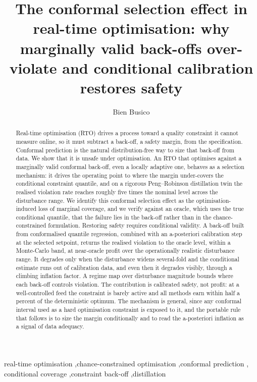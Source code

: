 \documentclass[review,times]{elsarticle}
\begin{document}
\begin{frontmatter}

\title{The conformal selection effect in real-time optimisation: why marginally valid
back-offs over-violate and conditional calibration restores safety}

\author{Bien Busico}

\begin{abstract}
Real-time optimisation (RTO) drives a process toward a quality constraint it cannot
measure online, so it must subtract a back-off, a safety margin, from the specification.
Conformal prediction is the natural distribution-free way to size that back-off from
data. We show that it is unsafe under optimisation. An RTO that optimises against a
marginally valid conformal back-off, even a locally adaptive one, behaves as a selection
mechanism: it drives the operating point to where the margin under-covers the conditional
constraint quantile, and on a rigorous Peng--Robinson distillation twin the realised
violation rate reaches roughly five times the nominal level across the disturbance range.
We identify this conformal selection effect as the optimisation-induced loss of marginal
coverage, and we verify against an oracle, which uses the true conditional quantile, that
the failure lies in the back-off rather than in the chance-constrained formulation.
Restoring safety requires conditional validity. A back-off built from conformalised
quantile regression, combined with an a-posteriori calibration step at the selected
setpoint, returns the realised violation to the oracle level, within a Monte-Carlo band,
at near-oracle profit over the operationally realistic disturbance range. It degrades only
when the disturbance widens several-fold and the conditional estimate runs out of
calibration data, and even then it degrades visibly, through a climbing inflation factor.
A regime map over disturbance magnitude bounds where each back-off controls violation. The
contribution is calibrated safety, not profit: at a well-controlled feed the constraint is
barely active and all methods earn within half a percent of the deterministic optimum. The
mechanism is general, since any conformal interval used as a hard optimisation constraint
is exposed to it, and the portable rule that follows is to size the margin conditionally
and to read the a-posteriori inflation as a signal of data adequacy.
\end{abstract}

\begin{keyword}
real-time optimisation \sep chance-constrained optimisation \sep conformal prediction \sep
conditional coverage \sep constraint back-off \sep distillation
\end{keyword}

\end{frontmatter}
\end{document}
